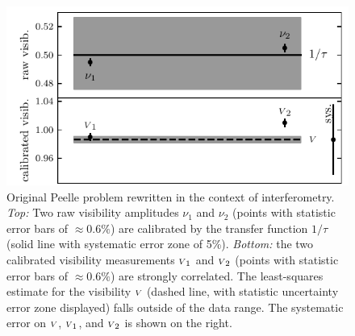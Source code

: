 \documentclass{pasa}
\begin{document}
\begin{figure}
\includegraphics[width=\linewidth]{pdf/original-peelle.pdf}
\caption{Original Peelle problem rewritten in the context of interferometry.  \emph{Top:} Two raw visibility amplitudes $\nu_1$ and $\nu_2$ (points with statistic error bars of $\approx 0.6\%$) are calibrated by the transfer function $1/\tau$ (solid line with systematic error zone of 5\%). \emph{Bottom:} the two calibrated visibility measurements ${\scriptstyle V}_1$ and ${\scriptstyle V}_2$ (points with statistic error bars of $\approx 0.6\%$) are strongly correlated. The least-squares estimate for the visibility ${\scriptstyle V}$ (dashed line, with statistic uncertainty error zone displayed) falls outside of the data range.  The systematic error on ${\scriptstyle V}$, ${\scriptstyle V}_1$, and ${\scriptstyle V}_2$ is shown on the right.}
\label{fig:peelle}
\end{figure}
\end{document}

